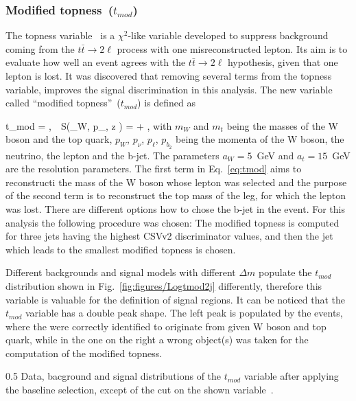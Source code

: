 \subsubsection{Modified topness~($t_{mod}$)}

The topness variable~\cite{Graesser:2012qy} is a $\chi^{2}$-like variable developed to suppress background coming from the $t \bar{t} \to 2\ell$ process with one misreconstructed lepton. Its aim is to evaluate how well an event agrees with the $t \bar{t} \to 2\ell$ hypothesis, given that one lepton is lost. It was discovered that removing several terms from the topness variable, improves the signal discrimination in this analysis. The new variable called ``modified topness''~($t_{mod}$) is defined as


{
 t_{mod} = ,~~S(_{W}, p_{\nu, z} ) =  + ,
}
with $m_{W}$ and  $m_{t}$ being the masses of the W boson and the top quark, ${p}_{W}$, ${p}_{\nu}$, ${p}_{\ell}$, ${p}_{b_{2}}$ being the momenta of the W boson, the neutrino, the lepton and the b-jet. The parameters $a_{W} =5$~GeV and $a_{t}=15$~GeV are the resolution parameters. The first term in Eq.~\ref{eq:tmod} aims to reconstructi the mass of the W boson whose lepton was selected and the purpose of the second term is to reconstruct the top mass of the leg, for which the lepton was lost. There are different options how to chose the  b-jet in the event. For this analysis the following procedure was chosen: The modified topness is computed for three jets having the highest CSVv2 discriminator values, and then the jet which leads to the smallest modified topness is chosen.

Different backgrounds and signal models with different $\Delta m$ populate the $t_{mod}$ distribution shown in Fig.~\ref{fig:figures/Logtmod2j} differently, therefore this variable is valuable for the definition of signal regions. It can be noticed that the $t_{mod}$ variable has a double peak shape. The left peak is populated by the events, where the were correctly identified to originate from given W boson and top quark, while in the one on the right a wrong object(s) was taken for the computation of the modified topness.

                 {0.5}       %
                 { Data, bacground and signal distributions of the $t_{mod}$ variable after applying the baseline selection, except of the cut on the shown variable~\cite{website:stopSupp}. }

